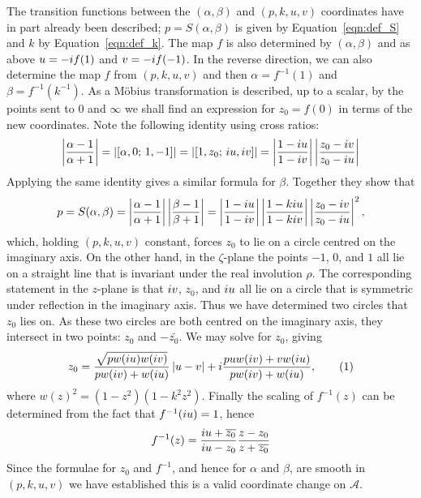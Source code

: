 \documentclass{article}
\begin{document}
The transition functions between the $(\alpha, \beta)$ and $(p,k,u,v)$ coordinates have in part already been described; $p = S(\alpha,\beta)$ is given by Equation~\eqref{eqn:def_S} and $k$ by Equation~\eqref{eqn:def_k}. The map $f$ is also determined by $(\alpha,\beta)$ and as above $u = -i f(1)$ and $v = -i f(-1)$. In the reverse direction, we can also determine the map $f$ from $(p,k,u,v)$ and then $\alpha = f^{-1}(1)$ and $\beta = f^{-1}(k^{-1})$. As a M\"obius transformation is described, up to a scalar, by the points sent to $0$ and $\infty$ we shall find an expression for $z_0 = f(0)$ in terms of the new coordinates. Note the following identity using cross ratios:
\[
\left|\frac{\alpha-1}{\alpha+1}\right|
= \left| \left[\alpha,0;\, 1, -1\right] \right|
= \left| \left[1,z_0;\, i u, i v\right] \right|
= \left|\frac{1-i u}{1 - i v}\right| \left|\frac{z_0 - i v}{z_0 - i u}\right|
\]
Applying the same identity gives a similar formula for $\beta$. Together they show that
\[
p = S(\alpha,\beta)
= \left|\frac{\alpha-1}{\alpha+1}\right| \left|\frac{\beta-1}{\beta+1}\right|
= \left|\frac{1-i u}{1 - i v}\right|\left|\frac{1 - ki u}{1 - ki v}\right| \left|\frac{z_0 - i v}{z_0 - i u}\right|^2,
\]
which, holding $(p,k,u,v)$ constant, forces $z_0$ to lie on a circle centred on the imaginary axis. On the other hand, in the $\zeta$-plane the points $-1$, $0$, and $1$ all lie on a straight line that is invariant under the real involution $\rho$. The corresponding statement in the $z$-plane is that $i v$, $z_0$, and $i u$ all lie on a circle that is symmetric under reflection in the imaginary axis. Thus we have determined two circles that $z_0$ lies on. As these two circles are both centred on the imaginary axis, they intersect in two points: $z_0$ and $-\bar{z_0}$. We may solve for $z_0$, giving
\[
z_0 = \frac{\sqrt{pw(\iu u)w(\iu v)}}{pw(\iu v) + w(\iu u)} \abs{u-v} + \iu\frac{puw(\iu v) + vw(\iu u)}{pw(\iu v) + w(\iu u)},
\labelthis{eqn:formula xy}
\]
where $w(z)^2 = (1-z^2)(1-k^2z^2)$. Finally the scaling of $f^{-1}(z)$ can be determined from the fact that $f^{-1}(i u) = 1$, hence 
\[
f^{-1}(z)
=  \frac{i u + \overline{z_0}}{i u - z_0} \frac{z-z_0}{z + \overline{z_0}}
\]
Since the formulae for $z_0$ and $f^{-1}$, and hence for $\alpha$ and $\beta$, are smooth in $(p,k,u,v)$ we have established this is a valid coordinate change on $\mathcal{A}$.
\end{document}
